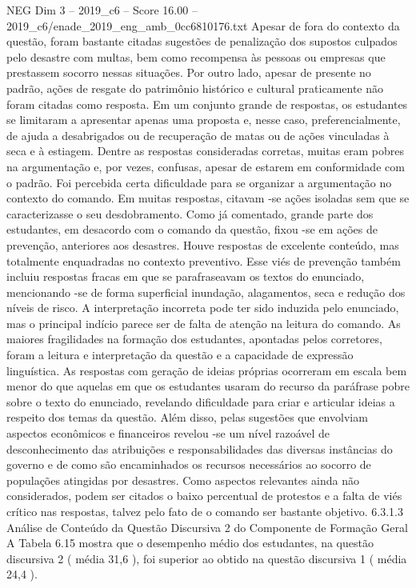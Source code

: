 \begin{textsample}{NEG Dim 3 – 2019\_c6 – Score 16.00 – 2019\_c6/enade\_2019\_eng\_amb\_0cc6810176.txt}
Apesar de fora do contexto da questão, foram bastante citadas sugestões de penalização dos supostos culpados pelo desastre com multas, bem como recompensa às pessoas ou empresas que prestassem socorro nessas situações.
Por outro lado, apesar de presente no padrão, ações de resgate do patrimônio histórico e cultural praticamente não foram citadas como resposta.
Em um conjunto grande de respostas, os estudantes se limitaram a apresentar apenas uma proposta e, nesse caso, preferencialmente, de ajuda a desabrigados ou de recuperação de matas ou de ações vinculadas à seca e à estiagem.
Dentre as respostas consideradas corretas, muitas eram pobres na argumentação e, por vezes, confusas, apesar de estarem em conformidade com o padrão.
Foi percebida certa dificuldade para se organizar a argumentação no contexto do comando.
Em muitas respostas, citavam -se ações isoladas sem que se caracterizasse o seu desdobramento.
Como já comentado, grande parte dos estudantes, em desacordo com o comando da questão, fixou -se em ações de prevenção, anteriores aos desastres.
Houve respostas de excelente conteúdo, mas totalmente enquadradas no contexto preventivo.
Esse viés de prevenção também incluiu respostas fracas em que se parafraseavam os textos do enunciado, mencionando -se de forma superficial inundação, alagamentos, seca e redução dos níveis de risco.
A interpretação incorreta pode ter sido induzida pelo enunciado, mas o principal indício parece ser de falta de atenção na leitura do comando.
As maiores fragilidades na formação dos estudantes, apontadas pelos corretores, foram a leitura e interpretação da questão e a capacidade de expressão linguística.
As respostas com geração de ideias próprias ocorreram em escala bem menor do que aquelas em que os estudantes usaram do recurso da paráfrase pobre sobre o texto do enunciado, revelando dificuldade para criar e articular ideias a respeito dos temas da questão.
Além disso, pelas sugestões que envolviam aspectos econômicos e financeiros revelou -se um nível razoável de desconhecimento das atribuições e responsabilidades das diversas instâncias do governo e de como são encaminhados os recursos necessários ao socorro de populações atingidas por desastres.
Como aspectos relevantes ainda não considerados, podem ser citados o baixo percentual de protestos e a falta de viés crítico nas respostas, talvez pelo fato de o comando ser bastante objetivo. 6.3.1.3 Análise de Conteúdo da Questão Discursiva 2 do Componente de Formação Geral A Tabela 6.15 mostra que o desempenho médio dos estudantes, na questão discursiva 2 ( média 31,6 ), foi superior ao obtido na questão discursiva 1 ( média 24,4 ).

\end{textsample}
